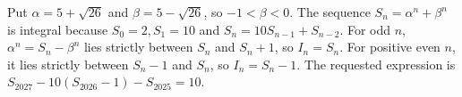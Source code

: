Put $\alpha=5+\sqrt{26}$ and $\beta=5-\sqrt{26}$, so $-1<\beta<0$. The sequence $S_n=\alpha^n+\beta^n$ is integral because $S_0=2,S_1=10$ and $S_n=10S_{n-1}+S_{n-2}$. For odd $n$, $\alpha^n=S_n-\beta^n$ lies strictly between $S_n$ and $S_n+1$, so $I_n=S_n$. For positive even $n$, it lies strictly between $S_n-1$ and $S_n$, so $I_n=S_n-1$. The requested expression is $S_{2027}-10(S_{2026}-1)-S_{2025}=\boxed{10}$.
